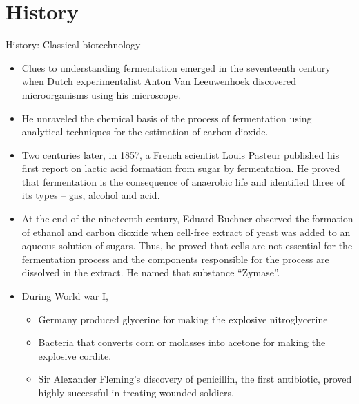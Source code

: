 \documentclass[
  ignorenonframetext,
  aspectratio=169]{beamer}
\providecommand{\tightlist}{%
  \setlength{\itemsep}{0pt}\setlength{\parskip}{0pt}}
\begin{document}
\hypertarget{history}{%
\section{History}\label{history}}

\begin{frame}{History: Classical biotechnology}
\protect\hypertarget{history-classical-biotechnology}{}
\begin{itemize}
\tightlist
\item
  Clues to understanding fermentation emerged in the seventeenth century
  when Dutch experimentalist Anton Van Leeuwenhoek discovered
  microorganisms using his microscope.
\item
  He unraveled the chemical basis of the process of fermentation using
  analytical techniques for the estimation of carbon dioxide.
\item
  Two centuries later, in 1857, a French scientist Louis Pasteur
  published his first report on lactic acid formation from sugar by
  fermentation. He proved that fermentation is the consequence of
  anaerobic life and identified three of its types -- gas, alcohol and
  acid.
\end{itemize}
\end{frame}

\begin{frame}{}
\protect\hypertarget{section-1}{}
\begin{itemize}
\tightlist
\item
  At the end of the nineteenth century, Eduard Buchner observed the
  formation of ethanol and carbon dioxide when cell-free extract of
  yeast was added to an aqueous solution of sugars. Thus, he proved that
  cells are not essential for the fermentation process and the
  components responsible for the process are dissolved in the extract.
  He named that substance ``Zymase''.
\item
  During World war I,

  \begin{itemize}
  \tightlist
  \item
    Germany produced glycerine for making the explosive nitroglycerine
  \item
    Bacteria that converts corn or molasses into acetone for making the
    explosive cordite.
  \item
    Sir Alexander Fleming's discovery of penicillin, the first
    antibiotic, proved highly successful in treating wounded soldiers.
  \end{itemize}
\end{itemize}
\end{frame}
\end{document}
